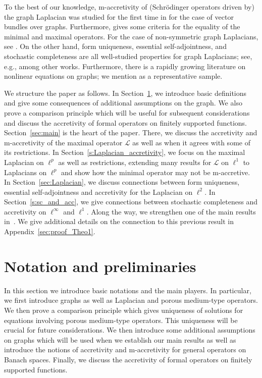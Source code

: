 \documentclass[letterpaper]{article}
\theoremstyle{definition}
\theoremstyle{named}
\numberwithin{equation}{section}
\newcommand{\Deltaphi}{\mathcal{L}}
\begin{document}
To the best of our knowledge, m-accretivity of (Schr\"odinger operators driven by) the graph Laplacian was studied for the first time in \cite{milatovic2015maximal} for the case of vector  bundles over graphs.  
Furthermore, \cite{milatovic2015maximal} gives some criteria for the equality of the minimal and maximal operators.
For the case of non-symmetric graph Laplacians, see \cite{anne2020m}.
On the other hand, form uniqueness, essential self-adjointness, and stochastic
completeness are all well-studied properties
for graph Laplacians; see, e.g., 
\cite{BG15, CTT11, Gol14, HKLW12, HK14, HKMW13, HKMRW, HMW21, IKMW25, Jor08,
JP11, KL12, keller2021graphs, KMW25, Mas09, Sch20, Tor10, Web10, Woj08, Woj09, Woj21} among other works. 
Furthermore, there is a rapidly growing literature on nonlinear equations on graphs; we
mention \cite{ma2022porous,punzo2025semilinear, GLY16a, GLY16b, GMP, HX23, LSZ23, LY21, LW17, KS18,HM15,berchio2026semilinear,berchio2026fractional} as a representative sample.

We structure the paper as follows.
In Section~\ref{sec:notation}, we 
introduce basic definitions and give some consequences of additional assumptions
on the graph. We also prove a comparison principle which will be useful for subsequent considerations
and discuss the accretivity of formal operators on finitely supported functions. 
Section~\ref{sec:main} is the heart of the paper.
There, we discuss the accretivity and m-accretivity of the maximal operator
$\Deltaphi$ as well as when it agrees with some of its restrictions.
In Section~\ref{s:Laplacian_accretivity}, we focus on the maximal Laplacian on $\ell^p$
as well as restrictions, extending many results for $\Deltaphi$ on $\ell^1$
to Laplacians on $\ell^p$ and show how the minimal operator
may not be m-accretive.
In Section~\ref{sec:Laplacian}, we discuss connections between form 
uniqueness, essential self-adjointness and accretivity for the Laplacian on $\ell^2$.
In Section~\ref{s:sc_and_acc}, we give connections between stochastic completeness
and accretivity on $\ell^\infty$ and $\ell^1$.
Along the way, we  
strengthen one of the main results
in~\cite{bianchi2022generalized}. 
We give additional details on the connection to this previous result
in Appendix~\ref{sec:proof_Theo1}.


\section{Notation and preliminaries}\label{sec:notation}
In this section we introduce basic notations and the main
players. In particular, we first introduce graphs as well as
Laplacian and porous medium-type operators. We then prove
a comparison principle which gives uniqueness of solutions
for equations involving porous medium-type operators. 
This uniqueness will be crucial for future considerations.
We then introduce some additional assumptions on graphs
which will be used when we establish our main results 
as well as introduce the notions of accretivity
and m-accretivity for general operators on Banach
spaces. Finally, we discuss the accretivity of formal
operators on finitely supported functions.
\end{document}

